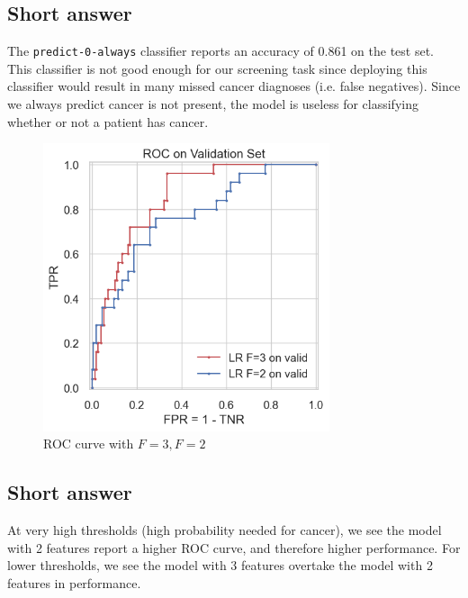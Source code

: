 \documentclass[12pt]{article}
\begin{document}
\subsection{Short answer}

The \verb|predict-0-always| classifier reports an accuracy of 0.861 on the test
set. This classifier is not good enough for our screening task since deploying
this classifier would result in many missed cancer diagnoses (i.e. false
negatives). Since we always
predict cancer is not present, the model is useless for classifying whether or
not a patient has cancer. 

\begin{figure}[htbp]
    \centering
    \includegraphics[width=0.75\textwidth]{fig1.png}  
    \caption{ROC curve with $F=3, F=2$}
    \label{fig:1}
\end{figure}

\subsection{Short answer}

At very high thresholds (high probability needed for cancer), we see the model
with 2 features report a higher ROC curve, and therefore higher performance.
For lower thresholds, we see the model with 3 features overtake the model with
2 features in performance. 
\end{document}
